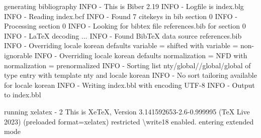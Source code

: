 \documentclass[
  letterpaper,
]{book}
\newenvironment{Shaded}{\begin{snugshade}}{\end{snugshade}}
\newcommand{\AttributeTok}[1]{\textcolor[rgb]{0.40,0.45,0.13}{#1}}
\newcommand{\DataTypeTok}[1]{\textcolor[rgb]{0.68,0.00,0.00}{#1}}
\newcommand{\ErrorTok}[1]{\textcolor[rgb]{0.68,0.00,0.00}{#1}}
\newcommand{\ExtensionTok}[1]{\textcolor[rgb]{0.00,0.23,0.31}{#1}}
\newcommand{\KeywordTok}[1]{\textcolor[rgb]{0.00,0.23,0.31}{#1}}
\newcommand{\NormalTok}[1]{\textcolor[rgb]{0.00,0.23,0.31}{#1}}
\newcommand{\StringTok}[1]{\textcolor[rgb]{0.13,0.47,0.30}{#1}}
\begin{document}
\begin{Shaded}
\begin{Highlighting}[]
\ExtensionTok{generating}\NormalTok{ bibliography}
  \ExtensionTok{INFO} \AttributeTok{{-}}\NormalTok{ This is Biber 2.19}
  \ExtensionTok{INFO} \AttributeTok{{-}}\NormalTok{ Logfile is }\StringTok{\textquotesingle{}index.blg\textquotesingle{}}
  \ExtensionTok{INFO} \AttributeTok{{-}}\NormalTok{ Reading }\StringTok{\textquotesingle{}index.bcf\textquotesingle{}}
  \ExtensionTok{INFO} \AttributeTok{{-}}\NormalTok{ Found 7 citekeys in bib section 0}
  \ExtensionTok{INFO} \AttributeTok{{-}}\NormalTok{ Processing section 0}
  \ExtensionTok{INFO} \AttributeTok{{-}}\NormalTok{ Looking for bibtex file }\StringTok{\textquotesingle{}references.bib\textquotesingle{}}\NormalTok{ for section 0}
  \ExtensionTok{INFO} \AttributeTok{{-}}\NormalTok{ LaTeX decoding ...}
  \ExtensionTok{INFO} \AttributeTok{{-}}\NormalTok{ Found BibTeX data source }\StringTok{\textquotesingle{}references.bib\textquotesingle{}}
  \ExtensionTok{INFO} \AttributeTok{{-}}\NormalTok{ Overriding locale }\StringTok{\textquotesingle{}korean\textquotesingle{}}\NormalTok{ defaults }\StringTok{\textquotesingle{}variable = shifted\textquotesingle{}}\NormalTok{ with }\StringTok{\textquotesingle{}variable = non{-}ignorable\textquotesingle{}}
  \ExtensionTok{INFO} \AttributeTok{{-}}\NormalTok{ Overriding locale }\StringTok{\textquotesingle{}korean\textquotesingle{}}\NormalTok{ defaults }\StringTok{\textquotesingle{}normalization = NFD\textquotesingle{}}\NormalTok{ with }\StringTok{\textquotesingle{}normalization = prenormalized\textquotesingle{}}
  \ExtensionTok{INFO} \AttributeTok{{-}}\NormalTok{ Sorting list }\StringTok{\textquotesingle{}nty/global//global/global\textquotesingle{}}\NormalTok{ of type }\StringTok{\textquotesingle{}entry\textquotesingle{}}\NormalTok{ with template }\StringTok{\textquotesingle{}nty\textquotesingle{}}\NormalTok{ and locale }\StringTok{\textquotesingle{}korean\textquotesingle{}}
  \ExtensionTok{INFO} \AttributeTok{{-}}\NormalTok{ No sort tailoring available for locale }\StringTok{\textquotesingle{}korean\textquotesingle{}}
  \ExtensionTok{INFO} \AttributeTok{{-}}\NormalTok{ Writing }\StringTok{\textquotesingle{}index.bbl\textquotesingle{}}\NormalTok{ with encoding }\StringTok{\textquotesingle{}UTF{-}8\textquotesingle{}}
  \ExtensionTok{INFO} \AttributeTok{{-}}\NormalTok{ Output to index.bbl}

\ExtensionTok{running}\NormalTok{ xelatex }\AttributeTok{{-}}\NormalTok{ 2}
  \ExtensionTok{This}\NormalTok{ is XeTeX, Version 3.141592653{-}2.6{-}0.999995 }\ErrorTok{(}\ExtensionTok{TeX}\NormalTok{ Live 2023}\KeywordTok{)} \KeywordTok{(}\ExtensionTok{preloaded}\NormalTok{ format=xelatex}\KeywordTok{)}
   \ExtensionTok{restricted} \DataTypeTok{\textbackslash{}w}\NormalTok{rite18 enabled.}
  \ExtensionTok{entering}\NormalTok{ extended mode}


\end{Highlighting}
\end{Shaded}
\end{document}
